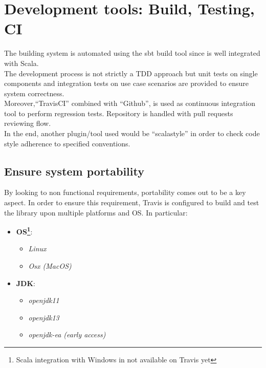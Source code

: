 \section{Development tools: Build, Testing, CI}

The building system is automated using the sbt build tool since is well integrated with Scala.
\\
The development process is not strictly a TDD approach but unit tests on single components and integration tests on use case scenarios are provided to ensure system correctness.  
\\
Moreover,``TravisCI'' combined with ``Github'', is used as continuous integration tool to perform regression tests. Repository is handled with pull requests reviewing flow.
\\
In the end, another plugin/tool used would be ``scalastyle'' in order to check code style adherence to specified conventions.

\subsection{Ensure system portability}

By looking to non functional requirements, portability comes out to be a key aspect. In order to ensure this requirement, Travis is configured to build and test the library upon multiple platforms and OS. In particular:
\begin{itemize}
\item \textbf{OS\footnote{Scala integration with Windows in not available on Travis yet}}: 
  \begin{itemize}
  \item \textit{Linux}
  \item \textit{Osx (MacOS)}
  \end{itemize}
\item \textbf{JDK}:
  \begin{itemize}
  \item \textit{openjdk11}
  \item \textit{openjdk13}
  \item \textit{openjdk-ea (early access)}
  \end{itemize} 
\end{itemize}  











 